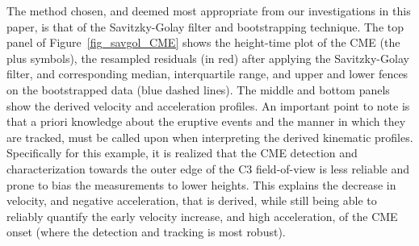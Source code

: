 \documentclass[structabstract]{aa}
\begin{document}
The method chosen, and deemed most appropriate from our investigations in this paper, is that of the Savitzky-Golay filter and bootstrapping technique. The top panel of Figure~\ref{fig_savgol_CME} shows the height-time plot of the CME (the plus symbols), the resampled residuals (in red) after applying the Savitzky-Golay filter, and corresponding median, interquartile range, and upper and lower fences on the bootstrapped data (blue dashed lines). The middle and bottom panels show the derived velocity and acceleration profiles. An important point to note is that a priori knowledge about the eruptive events and the manner in which they are tracked, must be called upon when interpreting the derived kinematic profiles. Specifically for this example, it is realized that the CME detection and characterization towards the outer edge of the C3 field-of-view is less reliable and prone to bias the measurements to lower heights. This explains the decrease in velocity, and negative acceleration, that is derived, while still being able to reliably quantify the early velocity increase, and high acceleration, of the CME onset (where the detection and tracking is most robust). 



\end{document}
